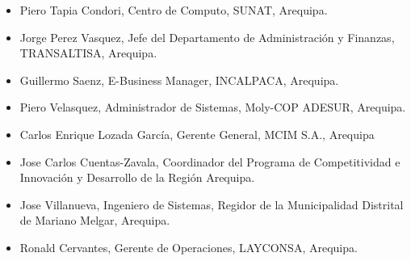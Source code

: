 \begin{itemize}
\item Piero Tapia Condori, Centro de Computo, SUNAT, Arequipa.
\item Jorge Perez Vasquez, Jefe del Departamento de Administración y Finanzas, TRANSALTISA, Arequipa.
\item Guillermo Saenz, E-Business Manager, INCALPACA, Arequipa.
\item Piero Velasquez, Administrador de Sistemas, Moly-COP ADESUR, Arequipa.
\item Carlos Enrique Lozada García, Gerente General, MCIM S.A., Arequipa
\item Jose Carlos Cuentas-Zavala, Coordinador del Programa de Competitividad e Innovación y Desarrollo de la Región Arequipa.
\item Jose Villanueva, Ingeniero de Sistemas, Regidor de la Municipalidad Distrital de Mariano Melgar, Arequipa.
\item Ronald Cervantes, Gerente de Operaciones, LAYCONSA, Arequipa.
\end{itemize}
